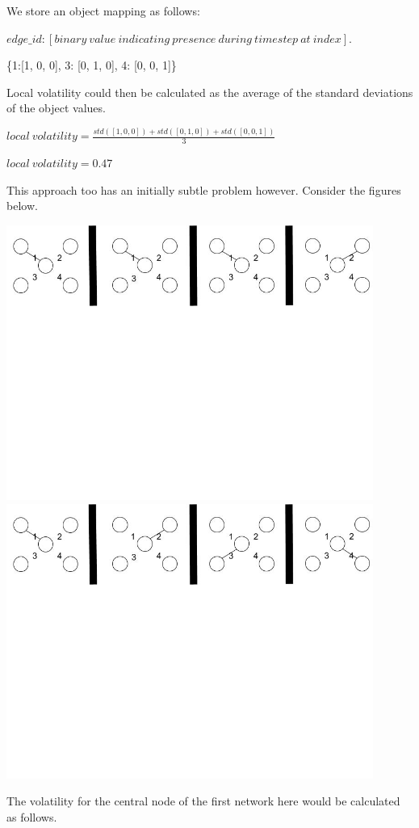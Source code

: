 We store an object mapping as follows:

$edge\_id: [binary\ value\ indicating\ presence\ during\ timestep\ at\ index].$

\begin{center}
\{1:[1, 0, 0], 3: [0, 1, 0], 4: [0, 0, 1]\}
\end{center}
Local volatility could then be calculated as the average of the standard deviations of the object values.
\begin{center}
$local\ volatility = \frac{std([1,0,0]) + std([0,1,0]) + std([0,0,1])}{3}$

$local\ volatility = 0.47$
\end{center}

This approach too has an initially subtle problem however. Consider the figures below.
\begin{center}
\includegraphics[trim={0 10cm 0 -1cm}, width=120mm]{./Figures/volatilityLastProblem1.jpg}
\includegraphics[trim={0 10cm 0 -1cm}, width=120mm]{./Figures/volatilityLastProblem2.jpg}
\end{center}
The volatility for the central node of the first network here would be calculated as follows.


